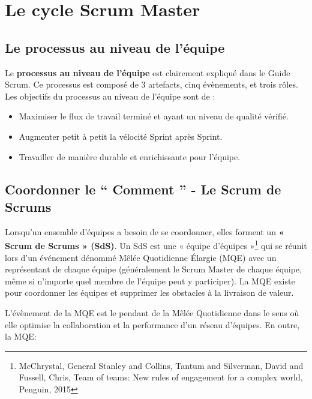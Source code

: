 \documentclass[12pt,a4paper,parskip=full]{scrartcl}
\begin{document}
\section{Le cycle Scrum Master}
\subsection{Le processus au niveau de l’équipe}
Le \textbf{processus au niveau de l’équipe} est clairement expliqué dans le Guide Scrum. Ce
processus est composé de 3 artefacts, cinq évènements, et trois rôles. Les objectifs du
processus au niveau de l’équipe sont de :
\begin{itemize}
\item Maximiser le flux de travail terminé et ayant un niveau de qualité vérifié.
\item Augmenter petit à petit la vélocité Sprint après Sprint.
\item Travailler de manière durable et enrichissante pour l’équipe.
\end{itemize}

\subsection{Coordonner le `` Comment '' - Le Scrum de Scrums}
Lorsqu’un ensemble d’équipes a besoin de se coordonner, elles forment un \textbf{« Scrum de
Scrums » (SdS)}. Un SdS est une « équipe d’équipes »\footnote{McChrystal, General Stanley and Collins, Tantum and
Silverman, David and Fussell, Chris, Team of teams: New rules of engagement
for a complex world, Penguin, 2015} qui se réunit lors d’un événement
dénommé Mêlée Quotidienne Élargie (MQE) avec un représentant de chaque équipe
(généralement le Scrum Master de chaque équipe, même si n’importe quel membre de
l’équipe peut y participer). La MQE existe pour coordonner les équipes et supprimer les obstacles à la livraison 
de valeur.

L’évènement de la MQE est le pendant de la Mêlée Quotidienne dans le sens où elle
optimise la collaboration et la performance d’un réseau d’équipes. En outre, la MQE:
\end{document}
